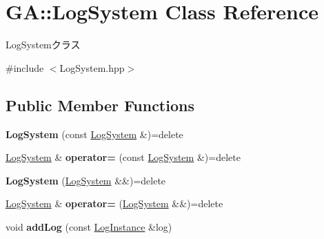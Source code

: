 \hypertarget{class_g_a_1_1_log_system}{}\section{GA\+::Log\+System Class Reference}
\label{class_g_a_1_1_log_system}


Log\+Systemクラス  




{\ttfamily \#include $<$Log\+System.\+hpp$>$}

\subsection*{Public Member Functions}
\begin{DoxyCompactItemize}
\item 
\mbox{\label{class_g_a_1_1_log_system_a8392ce9e3cef641f1b36009405bfb103}} 
{\bfseries Log\+System} (const \mbox{\hyperlink{class_g_a_1_1_log_system}{Log\+System}} \&)=delete
\item 
\mbox{\label{class_g_a_1_1_log_system_a2b1bded8fbbab1bc63a725b50da98c18}} 
\mbox{\hyperlink{class_g_a_1_1_log_system}{Log\+System}} \& {\bfseries operator=} (const \mbox{\hyperlink{class_g_a_1_1_log_system}{Log\+System}} \&)=delete
\item 
\mbox{\label{class_g_a_1_1_log_system_a7ba7151f3f987f69d034399dc8abd560}} 
{\bfseries Log\+System} (\mbox{\hyperlink{class_g_a_1_1_log_system}{Log\+System}} \&\&)=delete
\item 
\mbox{\label{class_g_a_1_1_log_system_af5d80a0c043182da9754ac655436a48e}} 
\mbox{\hyperlink{class_g_a_1_1_log_system}{Log\+System}} \& {\bfseries operator=} (\mbox{\hyperlink{class_g_a_1_1_log_system}{Log\+System}} \&\&)=delete
\item 
\mbox{\label{class_g_a_1_1_log_system_a5a9bc23d70b327a7d2890eb58b9bd59d}} 
void {\bfseries add\+Log} (const \mbox{\hyperlink{class_g_a_1_1_log_instance}{Log\+Instance}} \&log)
\end{DoxyCompactItemize}
